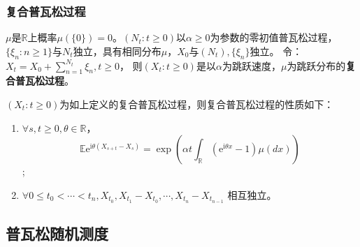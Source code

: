 \documentclass[main]{subfiles}
\begin{document}
\subsubsection{复合普瓦松过程}
\begin{definition}\label{def:复合普瓦松过程}
  \(\mu\)是\(\mathbb{R}\)上概率\(\mu(\{0\})=0\)。\((N_t: t \geq 0)\)以\(\alpha \geq 0\)为参数的零初值普瓦松过程，
  \(\{\xi_n:n \geq 1\}\)与\(N_t\)独立，具有相同分布\(\mu\)，\(X_0\)与\((N_t),\{\xi_n\}\)独立。
  令：\(X_t=X_0 + \sum_{n=1}^{N_t}\xi_n, t \geq 0\)，
  则\((X_t: t \geq 0)\)是以\(\alpha\)为跳跃速度，\(\mu\)为跳跃分布的\textbf{复合普瓦松过程}。
\end{definition}
\begin{theorem}\label{the:复合普瓦松过程的性质}
  \((X_t:t \geq 0)\)为如上定义的复合普瓦松过程，则复合普瓦松过程的性质如下：
  \begin{enumerate}
    \item \(\forall s,t \geq 0, \theta \in \mathbb{R}\)，\[
        \mathbb{E}\mathrm{e}^{\mathrm{i}\theta(X_{s + t}-X_s)}=\exp(\alpha t \int_{\mathbb{R}}(\mathrm{e}^{\mathrm{i}\theta x}-1)\mu(dx))\] ;
    \item \(\forall 0 \leq t_0 <\cdots<t_n, X_{t_0},X_{t_1}-X_{t_0},\cdots,X_{t_n}-X_{t_{n-1}} \) 相互独立。
  \end{enumerate}
\end{theorem}
\homework[4]
\subsection{普瓦松随机测度}
\end{document}
